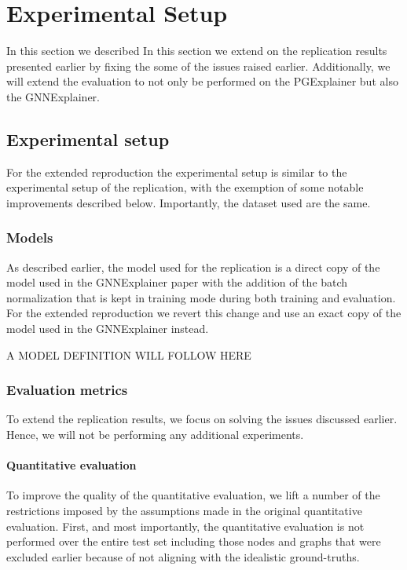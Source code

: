 \section{Experimental Setup}\label{sec:reproducibility} 
In this section we described
In this section we extend on the replication results presented earlier by fixing the some of the issues raised earlier. Additionally, we will extend the evaluation to not only be performed on the PGExplainer but also the GNNExplainer. 

\subsection{Experimental setup}
For the extended reproduction the experimental setup is similar to the experimental setup of the replication, with the exemption of some notable improvements described below. Importantly, the dataset used are the same. 

\subsubsection{Models}
As described earlier, the model used for the replication is a direct copy of the model used in the GNNExplainer paper with the addition of the batch normalization that is kept in training mode during both training and evaluation. For the extended reproduction we revert this change and use an exact copy of the model used in the GNNExplainer instead. 

A MODEL DEFINITION WILL FOLLOW HERE

\subsubsection{Evaluation metrics}
To extend the replication results, we focus on solving the issues discussed earlier. Hence, we will not be performing any additional experiments.

\paragraph{Quantitative evaluation}
To improve the quality of the quantitative evaluation, we lift a number of the restrictions imposed by the assumptions made in the original quantitative evaluation. First, and most importantly, the quantitative evaluation is not performed over the entire test set including those nodes and graphs that were excluded earlier because of not aligning with the idealistic ground-truths. 

